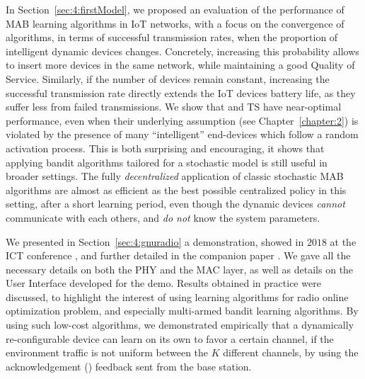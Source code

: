In Section~\ref{sec:4:firstModel}, we proposed an evaluation of the performance of MAB learning algorithms in IoT networks,
with a focus on the convergence of algorithms, in terms of successful transmission rates, when the proportion of intelligent dynamic devices changes.
Concretely, increasing this probability allows to insert more devices in the same network, while maintaining a good Quality of Service.
Similarly, if the number of devices remain constant, increasing the successful transmission rate directly extends the IoT devices battery life, as they suffer less from failed transmissions.
We show that \UCB{} and TS have near-optimal performance, even when their underlying \iid{} assumption (see Chapter~\ref{chapter:2}) is violated by the presence of many ``intelligent'' end-devices which follow a random activation process.
%
This is both surprising and encouraging, it shows that applying bandit algorithms tailored for a stochastic model is still useful in broader settings.
The fully \emph{decentralized} application of classic stochastic MAB algorithms are almost as efficient as the best possible centralized policy in this setting, after a short learning period, even though the dynamic devices \emph{cannot} communicate with each others, and \emph{do not} know the system parameters.


\label{sub:42:conclusionFromDemonstration}

We presented in Section~\ref{sec:4:gnuradio} a demonstration, showed in $2018$ at the ICT conference \cite{Besson2018ICT}, and further detailed in the companion paper \cite{Besson2019WCNC}.
We gave all the necessary details on both the PHY and the MAC layer, as well as details on the User Interface developed for the demo.
Results obtained in practice were discussed, to highlight the interest of using learning algorithms for radio online optimization problem, and especially multi-armed bandit learning algorithms.
%
By using such low-cost algorithms, we demonstrated empirically that a dynamically re-configurable device can learn on its own to favor a certain channel, if the environment traffic is not uniform between the $K$ different channels, by using the acknowledgement (\Ack) feedback sent from the base station.


\label{sub:43:conclusion}

